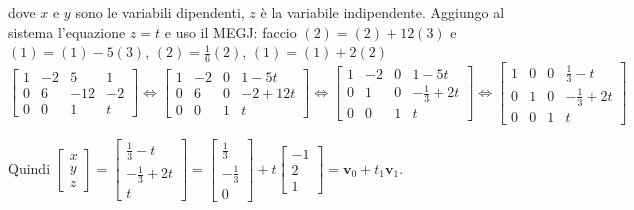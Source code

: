 \documentclass{article}
\begin{document}
\begin{enumerate}
dove $x$ e $y$ sono le variabili dipendenti, $z$ \`{e} la variabile
indipendente. Aggiungo al sistema l'equazione $z=t$ e uso il MEGJ: faccio $%
\left( 2\right) =\left( 2\right) +12\left( 3\right) $ e $\left( 1\right)
=\left( 1\right) -5\left( 3\right) $, $\left( 2\right) =\frac{1}{6}\left(
2\right) $, $\left( 1\right) =\left( 1\right) +2\left( 2\right) $%
\begin{equation*}
\left[ 
\begin{array}{cccc}
1 & -2 & 5 & 1 \\ 
0 & 6 & -12 & -2 \\ 
0 & 0 & 1 & t%
\end{array}%
\right] \Longleftrightarrow \left[ 
\begin{array}{cccc}
1 & -2 & 0 & 1-5t \\ 
0 & 6 & 0 & -2+12t \\ 
0 & 0 & 1 & t%
\end{array}%
\right] \Longleftrightarrow \left[ 
\begin{array}{cccc}
1 & -2 & 0 & 1-5t \\ 
0 & 1 & 0 & -\frac{1}{3}+2t \\ 
0 & 0 & 1 & t%
\end{array}%
\right] \Longleftrightarrow \left[ 
\begin{array}{cccc}
1 & 0 & 0 & \frac{1}{3}-t \\ 
0 & 1 & 0 & -\frac{1}{3}+2t \\ 
0 & 0 & 1 & t%
\end{array}%
\right]
\end{equation*}

Quindi $\left[ 
\begin{array}{c}
x \\ 
y \\ 
z%
\end{array}%
\right] =\left[ 
\begin{array}{c}
\frac{1}{3}-t \\ 
-\frac{1}{3}+2t \\ 
t%
\end{array}%
\right] =\left[ 
\begin{array}{c}
\frac{1}{3} \\ 
-\frac{1}{3} \\ 
0%
\end{array}%
\right] +t\left[ 
\begin{array}{c}
-1 \\ 
2 \\ 
1%
\end{array}%
\right] =\mathbf{v}_{0}+t_{1}\mathbf{v}_{1}$.


\end{enumerate}
\end{document}
